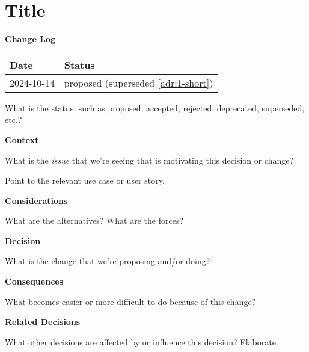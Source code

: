\section{Title}
\label{adr:2-new}

\textbf{Change Log}

\begin{tabular}{|l|l|}
    \hline
    \textbf{Date} & \textbf{Status} \\
    \hline
    2024-10-14 & proposed (superseded \ref{adr:1-short}) \\
    \hline
\end{tabular}

What is the status, such as proposed, accepted, rejected, deprecated, superseded, etc.?

\textbf{Context}

What is the \emph{issue} that we're seeing that is motivating this decision or change?

Point to the relevant use case or user story.

\textbf{Considerations}

What are the alternatives? What are the forces?

\textbf{Decision}

What is the change that we're proposing and/or doing?

\textbf{Consequences}

What becomes easier or more difficult to do because of this change?

\textbf{Related Decisions}

What other decisions are affected by or influence this decision? Elaborate.